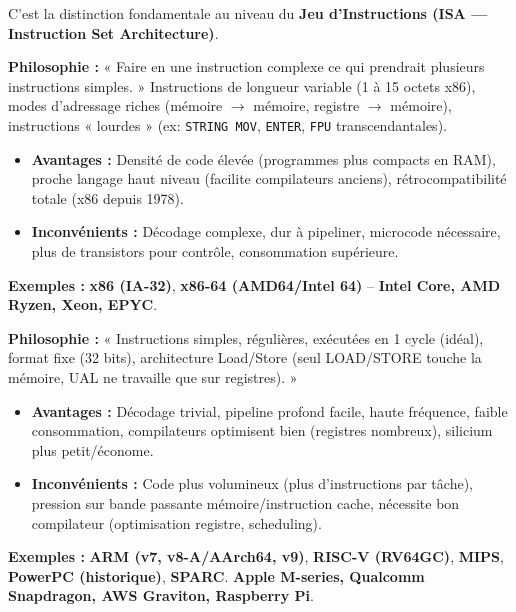 \documentclass[11pt]{article}
\newcounter{popsec}
\newcounter{popsub}
\newcommand{\courssub}[1]{%
  \stepcounter{popsub}%
  \par\vspace{9pt}\noindent{\popxbold\fontsize{11.5}{13}\selectfont\color{popink}{\color{poporange}\thepopsec.\thepopsub}\hspace{6pt}#1}\par\nopagebreak\vspace{4pt}
}
\begin{document}
\courssub{Architectures RISC et CISC}

C'est la distinction fondamentale au niveau du \textbf{Jeu d'Instructions (ISA — Instruction Set Architecture)}.

\begin{definition}
\textbf{Philosophie :} « Faire en une instruction complexe ce qui prendrait plusieurs instructions simples. » Instructions de longueur variable (1 à 15 octets x86), modes d'adressage riches (mémoire $\to$ mémoire, registre $\to$ mémoire), instructions « lourdes » (ex: \texttt{STRING MOV}, \texttt{ENTER}, \texttt{FPU} transcendantales).
\begin{itemize}
    \item \textbf{Avantages :} Densité de code élevée (programmes plus compacts en RAM), proche langage haut niveau (facilite compilateurs anciens), rétrocompatibilité totale (x86 depuis 1978).
    \item \textbf{Inconvénients :} Décodage complexe, dur à pipeliner, microcode nécessaire, plus de transistors pour contrôle, consommation supérieure.
\end{itemize}
\textbf{Exemples :} \textbf{x86 (IA-32)}, \textbf{x86-64 (AMD64/Intel 64)} -- \textbf{Intel Core, AMD Ryzen, Xeon, EPYC}.
\end{definition}

\begin{definition}
\textbf{Philosophie :} « Instructions simples, régulières, exécutées en 1 cycle (idéal), format fixe (32 bits), architecture Load/Store (seul LOAD/STORE touche la mémoire, UAL ne travaille que sur registres). »
\begin{itemize}
    \item \textbf{Avantages :} Décodage trivial, pipeline profond facile, haute fréquence, faible consommation, compilateurs optimisent bien (registres nombreux), silicium plus petit/économe.
    \item \textbf{Inconvénients :} Code plus volumineux (plus d'instructions par tâche), pression sur bande passante mémoire/instruction cache, nécessite bon compilateur (optimisation registre, scheduling).
\end{itemize}
\textbf{Exemples :} \textbf{ARM (v7, v8-A/AArch64, v9)}, \textbf{RISC-V (RV64GC)}, \textbf{MIPS}, \textbf{PowerPC (historique)}, \textbf{SPARC}. \textbf{Apple M-series, Qualcomm Snapdragon, AWS Graviton, Raspberry Pi}.
\end{definition}
\end{document}
